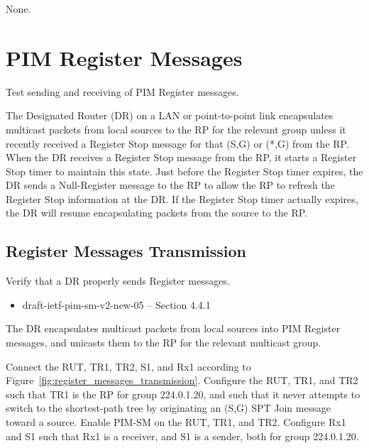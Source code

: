 \documentclass[11pt]{report}
\begin{document}
None.


\chapter{PIM Register Messages}

Test sending and receiving of PIM Register messages.

The Designated Router (DR) on a LAN or point-to-point link encapsulates
multicast packets from local sources to the RP for the relevant group
unless it recently received a Register Stop message for that (S,G) or
(*,G) from the RP.  When the DR receives a Register Stop message from
the RP, it starts a Register Stop timer to maintain this state.  Just
before the Register Stop timer expires, the DR sends a Null-Register
message to the RP to allow the RP to refresh the Register Stop
information at the DR.  If the Register Stop timer actually expires, the
DR will resume encapsulating packets from the source to the RP.

\newpage
\section{Register Messages Transmission}

Verify that a DR properly sends Register messages.

\begin{itemize}
  \item draft-ietf-pim-sm-v2-new-05 -- Section 4.4.1
\end{itemize}

The DR encapsulates multicast packets from local sources into PIM Register
messages, and unicasts them to the RP for the relevant multicast group.

Connect the RUT, TR1, TR2, S1, and Rx1 according to
Figure~\ref{fig:register_messages_transmission}.
Configure the RUT, TR1, and TR2 such that TR1 is the RP for group 224.0.1.20,
and such that it never attempts to switch to the shortest-path tree by
originating an (S,G) SPT Join message toward a source.
Enable PIM-SM on the RUT, TR1, and TR2.
Configure Rx1 and S1 such that Rx1 is a receiver, and S1 is a sender,
both for group 224.0.1.20.
\end{document}
